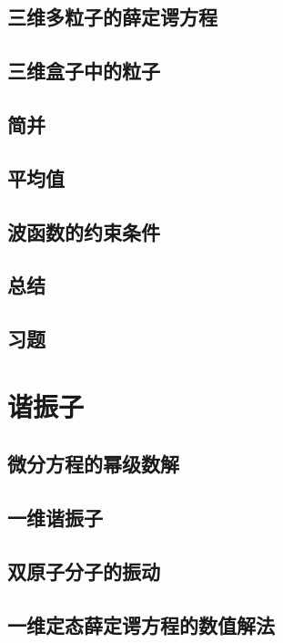\documentclass{book}
\begin{document}
	\section{三维多粒子的薛定谔方程}
	
	\section{三维盒子中的粒子}
	
	\section{简并}
	
	\section{平均值}
	
	\section{波函数的约束条件}
	
	\section*{总结}

	\section*{习题}
	
	
	\chapter{谐振子}
	\section{微分方程的幂级数解}
	
	\section{一维谐振子}
	
	\section{双原子分子的振动}
	
	\section{一维定态薛定谔方程的数值解法}
	
\end{document}
